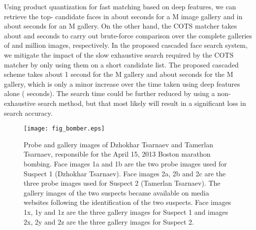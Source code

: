 \documentclass[10pt,journal,compsoc]{IEEEtran}
\begin{document}
Using product quantization for fast matching based on deep features, we can retrieve the top- candidate faces in about  seconds for a M image gallery and in about  seconds for an M gallery. On the other hand, the COTS matcher takes about  and  seconds to carry out brute-force comparison over the complete galleries of  and  million images, respectively. In the proposed cascaded face search system, we mitigate the impact of the slow exhaustive search required by the COTS matcher by only using them on a short candidate list. The proposed cascaded scheme takes about 1 second for the M gallery and about  seconds for the M gallery, which is only a minor increase over the time taken using deep features alone ( seconds). The search time could be further reduced by using a non-exhaustive search method, but that most likely will result in a significant loss in search accuracy.
\begin{figure}[htbp]
\centering
\texttt{[image: fig\_bomber.eps]}
\caption{Probe and gallery images of Dzhokhar Tsarnaev and Tamerlan Tsarnaev, responsible for the April 15, 2013 Boston marathon bombing. Face images 1a and 1b are the two probe images used for Suspect 1 (Dzhokhar Tsarnaev). Face images 2a, 2b and 2c are the three probe images used for Suspect 2 (Tamerlan Tsarnaev). The gallery images of the two suspects became available on media websites following the identification of the two suspects. Face images 1x, 1y and 1z are the three gallery images for Suspect 1 and images 2x, 2y and 2z are the three gallery images for Suspect 2.}
\label{fig:bombers}
\end{figure}
\end{document}
